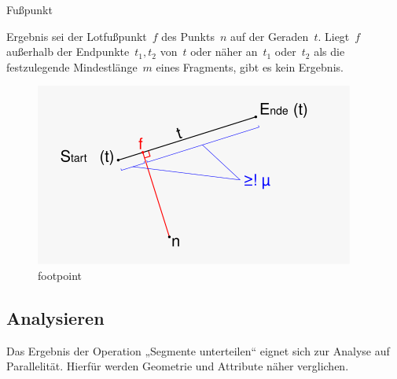 \documentclass[../main/thesis.tex]{subfiles}
\begin{document}
\begin{algorithm}[H]
\caption{Fußpunkt}\label{alg:Fusspunkt}
\begin{algorithmic}
	\State Ergebnis sei der Lotfußpunkt~$f$ des Punkts~$n$ auf der Geraden~$t$. Liegt~$f$ außerhalb der Endpunkte~$t_1, t_2$ von~$t$ oder näher an~$t_1$ oder~$t_2$ als die festzulegende Mindestlänge~$m$ eines Fragments, gibt es kein Ergebnis.
\EndFunction
\end{algorithmic}
\end{algorithm}

\begin{figure}[ht]
    \centering
    \includegraphics[width=\ScaleIfNeeded]{../chapter4/footpoint}
    \caption{footpoint}\label{fig:footpoint}
\end{figure}

\subsection{Analysieren}

Das Ergebnis der Operation „Segmente unterteilen“ eignet sich zur Analyse auf Parallelität.
Hierfür werden Geometrie und Attribute näher verglichen.

\end{document}
